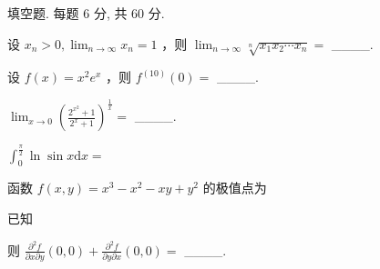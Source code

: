 \par{}
填空题. 每题 6 分, 共 60 分.\par
设  $x_{n}>0,\lim_{n\to\infty}x_{n}=1$ ，则  $\lim_{n\to\infty}\sqrt[n]{x_{1}x_{2}\cdots x_{n}}=$  \_\_\_\_.\par
设  $f(x)=x^{2}e^{x}$ ，则  $f^{(10)}(0)=$  \_\_\_\_.\par
$\lim_{x\to0}\left(\frac{2^{x^{2}}+1}{2^{x}+1}\right)^{\frac{1}{x}}=$  \_\_\_\_.\par
$\int_{0}^{\frac{\pi}{2}}\ln \sin x\mathrm{d}x =$\par
函数 $f(x, y) = x^3 - x^2 - xy + y^2$ 的极值点为\par
\par{}
已知\par
\nopagebreak[4]
则  $\frac{\partial^{2}f}{\partial x\partial y}(0,0)+\frac{\partial^{2}f}{\partial y\partial x}(0,0)=$  \_\_\_\_.\par
